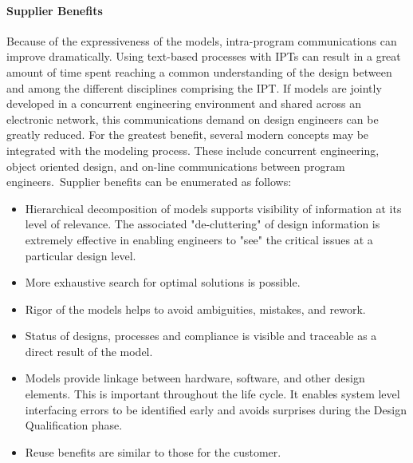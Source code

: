 \documentclass[a4paper,12pt,twoside]{report}
\begin{document}
			\paragraph{Supplier Benefits} {Because of the expressiveness of the models, intra-program communications can improve dramatically. Using text-based processes with IPTs can result in a great amount of time spent reaching a common understanding of the design between and among the different disciplines comprising the IPT. If models are jointly developed in a concurrent engineering environment and shared across an electronic network, this communications demand on design engineers can be greatly reduced. For the greatest benefit, several modern concepts may be integrated with the modeling process. These include concurrent engineering, object oriented design, and on-line communications between program engineers.\ Supplier benefits can be enumerated as follows: \cite{FoundationalConceptsMDSD}
			}
			\begin{itemize}
				\item Hierarchical decomposition of models supports visibility of information at its level of relevance. The associated "de-cluttering" of design information is extremely effective in enabling engineers to "see" the critical issues at a particular design level.
				\item More exhaustive search for optimal solutions is possible.
				\item Rigor of the models helps to avoid ambiguities, mistakes, and rework.
				\item Status of designs, processes and compliance is visible and traceable as a direct result of the model.
				\item Models provide linkage between hardware, software, and other design elements. This is important throughout the life cycle. It enables system level interfacing errors to be identified early and avoids surprises during the Design Qualification phase.
				\item Reuse benefits are similar to those for the customer.
			\end{itemize}
			
\end{document}
